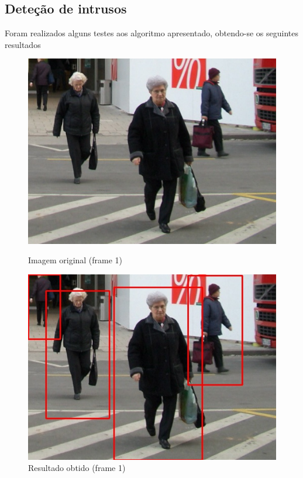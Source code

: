 \subsection{Deteção de intrusos}


Foram realizados alguns testes aos algoritmo apresentado, obtendo-se os seguintes resultados




\begin{figure}[h]
	\centering
	\begin{minipage}[b]{0.49\textwidth}
		\centering
		\includegraphics[width=\textwidth]{img/vision/exemplos/frame1.jpg}
		\caption{Imagem original (frame 1)}
		\label{bluetth05-res}
	\end{minipage}
	\hfill
	\begin{minipage}[b]{0.49\textwidth}
		\centering
		\includegraphics[width=\textwidth]{img/vision/exemplos/result_frame1.jpg}
		\caption{Resultado obtido (frame 1)}
		\label{comimageesquema}
	\end{minipage}
\end{figure}



